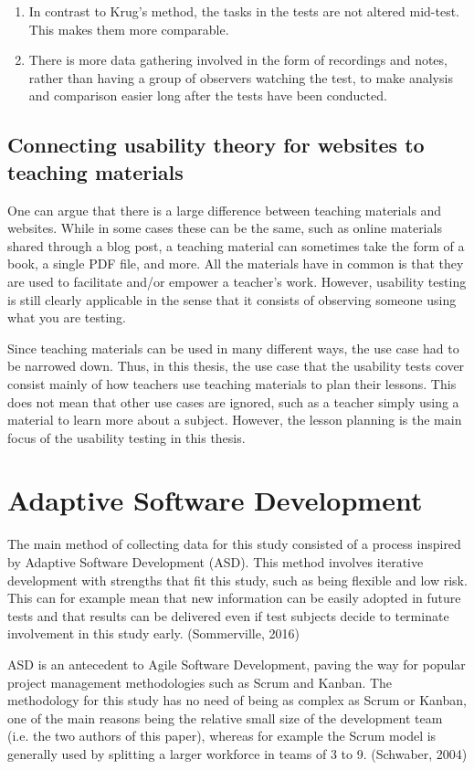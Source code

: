 \begin{enumerate}
	\item In contrast to Krug's method, the tasks in the tests are not altered mid-test. This makes them more comparable.
	\item There is more data gathering involved in the form of recordings and notes, rather than having a group of observers watching the test, to make analysis and comparison easier long after the tests have been conducted.
\end{enumerate}

\subsection{Connecting usability theory for websites to teaching materials}

One can argue that there is a large difference between teaching materials and websites. While in some cases these can be the same, such as online materials shared through a blog post, a teaching material can sometimes take the form of a book, a single PDF file, and more. All the materials have in common is that they are used to facilitate and/or empower a teacher's work. However, usability testing is still clearly applicable in the sense that it consists of observing someone using what you are testing.

Since teaching materials can be used in many different ways, the use case had to be narrowed down. Thus, in this thesis, the use case that the usability tests cover consist mainly of how teachers use teaching materials to plan their lessons. This does not mean that other use cases are ignored, such as a teacher simply using a material to learn more about a subject. However, the lesson planning is the main focus of the usability testing in this thesis.

\section{Adaptive Software Development}
The main method of collecting data for this study consisted of a process inspired by Adaptive Software Development (ASD). This method involves iterative development with strengths that fit this study, such as being flexible and low risk. This can for example mean that new information
can be easily adopted in future tests and that results can be delivered even if test subjects decide to terminate involvement in this study early. (Sommerville, 2016)

ASD is an antecedent to Agile Software Development, paving the way for popular project management methodologies such as Scrum and Kanban. The methodology for this study has no need of being as complex as Scrum or Kanban, one of the main reasons being the relative small size of the development team (i.e. the two authors of this paper), whereas for example the Scrum model is generally used by splitting a larger workforce in teams of 3 to 9. (Schwaber, 2004)

